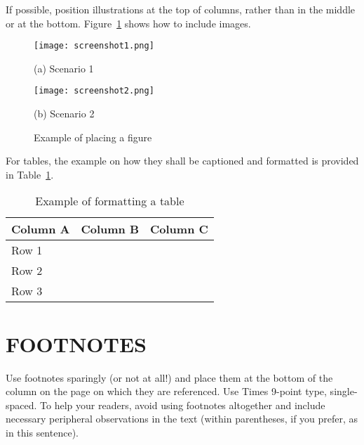 \documentclass{article}
\begin{document}
If possible, position illustrations at the top of columns, rather than in the middle or at the bottom. Figure~\ref{fig:res} shows how to include images.

\begin{figure}[htb]
\begin{minipage}[b]{.48\linewidth}
  \centering
	\texttt{[image: screenshot1.png]}
  \centerline{(a) Scenario 1}\medskip
\end{minipage}
\hfill
\begin{minipage}[b]{0.48\linewidth}
  \centering
	\texttt{[image: screenshot2.png]}
  \centerline{(b) Scenario 2}\medskip
\end{minipage}
\caption{Example of placing a figure}
\label{fig:res}
\end{figure}

For tables, the example on how they shall be captioned and formatted is provided in Table~\ref{tab:res}.

\begin{table}[htb]
\centering
\caption{Example of formatting a table}\vspace{2mm}
\begin{tabular}{lll}
\hline\hline
Column A & Column B & Column C\\
\hline
Row 1 &  & \\
Row 2 &  & \\
Row 3 &  & \\
\hline\hline
\end{tabular}
\label{tab:res}
\end{table}

\vfill
\pagebreak

\section{FOOTNOTES}
\label{sec:foot}

Use footnotes sparingly (or not at all!) and place them at the bottom of the
column on the page on which they are referenced. Use Times 9-point type,
single-spaced. To help your readers, avoid using footnotes altogether and
include necessary peripheral observations in the text (within parentheses, if
you prefer, as in this sentence).
\end{document}
